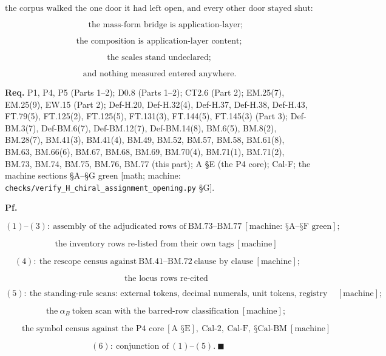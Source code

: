 \documentclass[11pt,openany]{report}
\theoremstyle{canonplain}
\theoremstyle{canondef}
\begin{document}
\[
\text{the corpus walked the one door it had left open, and every other door stayed shut}:
\]

\[
\qquad \text{the mass-form bridge is application-layer};
\]

\[
\ \ \text{the composition is application-layer content};
\]

\[
\ \ \text{the scales stand undeclared};
\]

\[
\ \ \text{and nothing measured entered anywhere}.
\]

\textbf{Req.} P1, P4, P5 (Parts 1–2); D0.8 (Parts 1–2); CT2.6 (Part 2); EM.25(7), EM.25(9), EW.15 (Part 2); Def-H.20, Def-H.32(4), Def-H.37, Def-H.38, Def-H.43, FT.79(5), FT.125(2), FT.125(5), FT.131(3), FT.144(5), FT.145(3) (Part 3); Def-BM.3(7), Def-BM.6(7), Def-BM.12(7), Def-BM.14(8), BM.6(5), BM.8(2), BM.28(7), BM.41(3), BM.41(4), BM.49, BM.52, BM.57, BM.58, BM.61(8), BM.63, BM.66(6), BM.67, BM.68, BM.69, BM.70(4), BM.71(1), BM.71(2), BM.73, BM.74, BM.75, BM.76, BM.77 (this part); A §E (the P4 core); Cal-F; the machine sections §A–§G green [math; machine: \texttt{checks/\allowbreak{}verify\_\allowbreak{}H\_\allowbreak{}chiral\_\allowbreak{}assignment\_\allowbreak{}opening.py} §G].

\textbf{Pf.}

\[
(1)\text{--}(3):\ \text{assembly of the adjudicated rows of}\ \mathrm{BM.73}\text{--}\mathrm{BM.77}\ [\text{machine: §A--§F green}];
\]

\[
\qquad \text{the inventory rows re-listed from their own tags}\ [\text{machine}]
\]

\[
(4):\ \text{the rescope census against}\ \mathrm{BM.41}\text{--}\mathrm{BM.72}\ \text{clause by clause}\ [\text{machine}];
\]

\[
\qquad \text{the locus rows re-cited}
\]

\[
(5):\ \text{the standing-rule scans: external tokens, decimal numerals, unit tokens, registry tokens, declaration lines}\ [\text{machine}];
\]

\[
\qquad \text{the}\ \alpha_B\ \text{token scan with the barred-row classification}\ [\text{machine}];
\]

\[
\qquad \text{the symbol census against the P4 core}\ [\text{A §E}],\ \mathrm{Cal\text{-}2},\ \mathrm{Cal\text{-}F},\ \text{§Cal-BM}\ [\text{machine}]
\]

\[
(6):\ \text{conjunction of}\ (1)\text{--}(5). \ \blacksquare
\]
\end{document}
